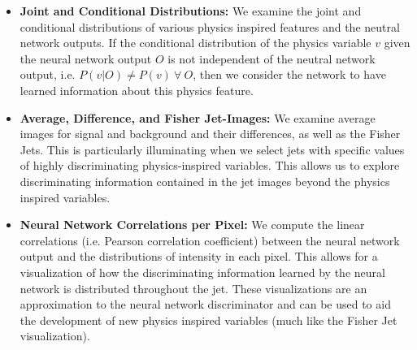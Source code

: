 \begin{itemize}
\item \textbf{Joint and Conditional Distributions:}  We examine the joint and conditional distributions of various physics inspired features and the neutral network outputs.  If the conditional distribution of the physics variable $v$ given the neural network output $O$ is not independent of the neutral network output, i.e. $P(v|O) \neq P(v)\ \forall\ O$, then we consider the network to have learned information about this physics feature.

\item \textbf{Average, Difference, and Fisher Jet-Images:}  We examine average images for signal and background and their differences, as well as the Fisher Jets.  This is particularly illuminating when we select jets with specific values of highly discriminating physics-inspired variables.  This allows us to explore discriminating information contained in the jet images beyond the physics inspired variables.

\item \textbf{Neural Network Correlations per Pixel:}  We compute the linear correlations (i.e. Pearson correlation coefficient) between the neural network output and the distributions of intensity in each pixel.  This allows for a visualization of how the discriminating information learned by the neural network is distributed throughout the jet.  These visualizations are an approximation to the neural network discriminator and can be used to aid the development of new physics inspired variables (much like the Fisher Jet visualization).

\end{itemize}

